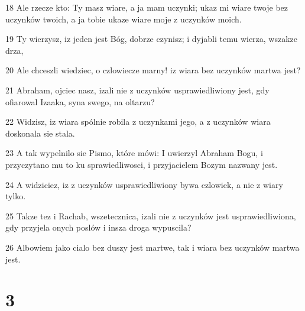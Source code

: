 \par 18 Ale rzecze kto: Ty masz wiare, a ja mam uczynki; ukaz mi wiare twoje bez uczynków twoich, a ja tobie ukaze wiare moje z uczynków moich.
\par 19 Ty wierzysz, iz jeden jest Bóg, dobrze czynisz; i dyjabli temu wierza, wszakze drza,
\par 20 Ale chceszli wiedziec, o czlowiecze marny! iz wiara bez uczynków martwa jest?
\par 21 Abraham, ojciec nasz, izali nie z uczynków usprawiedliwiony jest, gdy ofiarowal Izaaka, syna swego, na oltarzu?
\par 22 Widzisz, iz wiara spólnie robila z uczynkami jego, a z uczynków wiara doskonala sie stala.
\par 23 A tak wypelnilo sie Pismo, które mówi: I uwierzyl Abraham Bogu, i przyczytano mu to ku sprawiedliwosci, i przyjacielem Bozym nazwany jest.
\par 24 A widziciez, iz z uczynków usprawiedliwiony bywa czlowiek, a nie z wiary tylko.
\par 25 Takze tez i Rachab, wszetecznica, izali nie z uczynków jest usprawiedliwiona, gdy przyjela onych poslów i insza droga wypuscila?
\par 26 Albowiem jako cialo bez duszy jest martwe, tak i wiara bez uczynków martwa jest.

\chapter{3}

